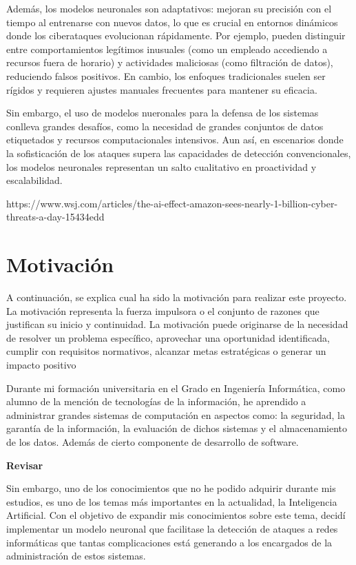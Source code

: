 Además, los modelos neuronales son adaptativos: mejoran su precisión con el tiempo al entrenarse con nuevos datos, lo que es crucial en entornos dinámicos donde los ciberataques evolucionan rápidamente. Por ejemplo, pueden distinguir entre comportamientos legítimos inusuales (como un empleado accediendo a recursos fuera de horario) y actividades maliciosas (como filtración de datos), reduciendo falsos positivos. En cambio, los enfoques tradicionales suelen ser rígidos y requieren ajustes manuales frecuentes para mantener su eficacia.

Sin embargo, el uso de modelos nueronales para la defensa de los sistemas conlleva grandes desafíos, como la necesidad de grandes conjuntos de datos etiquetados y recursos computacionales intensivos. Aun así, en escenarios donde la sofisticación de los ataques supera las capacidades de detección convencionales, los modelos neuronales representan un salto cualitativo en proactividad y escalabilidad. 


https://www.wsj.com/articles/the-ai-effect-amazon-sees-nearly-1-billion-cyber-threats-a-day-15434edd


\section{Motivación} \label{sec.motivacion}
A continuación, se explica cual ha sido la motivación para realizar este proyecto. La motivación representa la fuerza impulsora o el conjunto de razones que justifican su inicio y continuidad. La motivación puede originarse de la necesidad de resolver un problema específico, aprovechar una oportunidad identificada, cumplir con requisitos normativos, alcanzar metas estratégicas o generar un impacto positivo

Durante mi formación universitaria en el Grado en Ingeniería Informática, como alumno 
de la mención de tecnologías de la información, he aprendido a administrar grandes sistemas de computación en aspectos como: la seguridad, la garantía de la información, la evaluación de dichos sistemas y el almacenamiento de los datos. Además de cierto componente de desarrollo de software.

\textbf{Revisar}

Sin embargo, uno de los conocimientos que no he podido adquirir durante mis estudios, es uno de los temas más importantes en la actualidad, la Inteligencia Artificial. Con el objetivo de expandir mis conocimientos sobre este tema, decidí implementar un modelo neuronal que facilitase la detección de ataques a redes informáticas que tantas complicaciones está generando a los encargados de la administración de estos sistemas.

